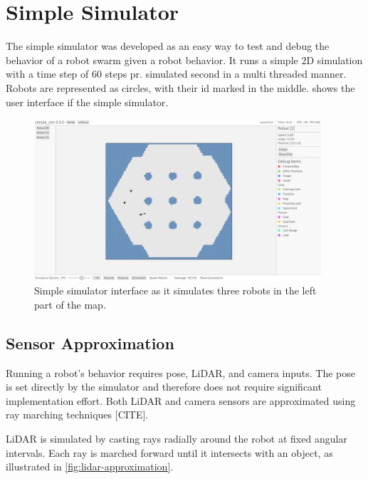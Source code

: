 
\section{Simple Simulator}
The simple simulator was developed as an easy way to test and debug the behavior of a robot swarm given a robot behavior. It runs a simple 2D simulation with a time step of 60 steps pr. simulated second in a multi threaded manner. Robots are represented as circles, with their id marked in the middle. 
 shows the user interface if the simple simulator.

\begin{figure}[H]
    \begin{center}
        \includegraphics[width=0.95\textwidth]{figures/simple-sim-gui.png}
    \end{center}
    \caption{Simple simulator interface as it simulates three robots in the left part of the map.}\label{fig:simple-sim-interface}
\end{figure}

\subsection{Sensor Approximation}
Running a robot's behavior requires pose, LiDAR, and camera inputs. The pose is set directly by the simulator and therefore does not require significant implementation effort. Both LiDAR and camera sensors are approximated using ray marching techniques {\color{red}[CITE]}.

LiDAR is simulated by casting rays radially around the robot at fixed angular intervals. Each ray is marched forward until it intersects with an object, as illustrated in \cref{fig:lidar-approximation}.

